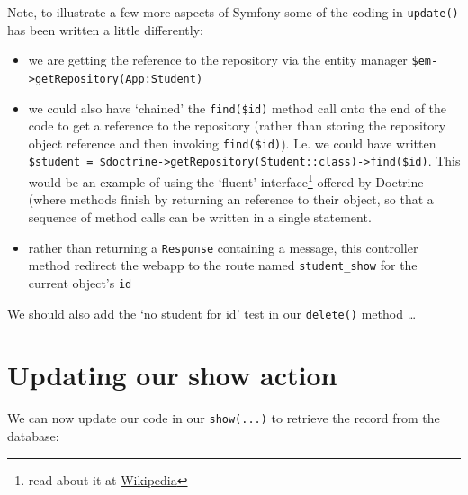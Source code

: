 \documentclass[a4paperpaper,openright]{book}
\newenvironment{Shaded}{}{}
\newcommand{\CommentTok}[1]{\textcolor[rgb]{0.38,0.63,0.69}{\textit{#1}}}
\newcommand{\KeywordTok}[1]{\textcolor[rgb]{0.00,0.44,0.13}{\textbf{#1}}}
\newcommand{\NormalTok}[1]{#1}
\newcommand{\OtherTok}[1]{\textcolor[rgb]{0.00,0.44,0.13}{#1}}
\providecommand{\tightlist}{%
  \setlength{\itemsep}{0pt}\setlength{\parskip}{0pt}}
\begin{document}
Note, to illustrate a few more aspects of Symfony some of the coding in
\texttt{update()} has been written a little differently:

\begin{itemize}
\tightlist
\item
  we are getting the reference to the repository via the entity manager
  \texttt{\$em-\textgreater{}getRepository(\textquotesingle{}App:Student\textquotesingle{})}
\item
  we could also have `chained' the \texttt{find(\$id)} method call onto
  the end of the code to get a reference to the repository (rather than
  storing the repository object reference and then invoking
  \texttt{find(\$id)}). I.e. we could have written
  \texttt{\$student\ =\ \$doctrine-\textgreater{}getRepository(Student::class)-\textgreater{}find(\$id)}.
  This would be an example of using the `fluent' interface\footnote{read
    about it at
    \href{https://en.wikipedia.org/wiki/Fluent_interface}{Wikipedia}}
  offered by Doctrine (where methods finish by returning an reference to
  their object, so that a sequence of method calls can be written in a
  single statement.
\item
  rather than returning a \texttt{Response} containing a message, this
  controller method redirect the webapp to the route named
  \texttt{student\_show} for the current object's \texttt{id}
\end{itemize}

We should also add the `no student for id' test in our \texttt{delete()}
method \ldots{}

\hypertarget{updating-our-show-action}{%
\section{Updating our show action}\label{updating-our-show-action}}

We can now update our code in our \texttt{show(...)} to retrieve the
record from the database:

\begin{Shaded}
\end{Shaded}
\end{document}
